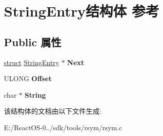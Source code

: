 \hypertarget{struct_string_entry}{}\section{String\+Entry结构体 参考}
\label{struct_string_entry}
\subsection*{Public 属性}
\begin{DoxyCompactItemize}
\item 
\mbox{\label{struct_string_entry_a480fd91372cd6d230a9219f2ee372bce}} 
\hyperlink{interfacestruct}{struct} \hyperlink{struct_string_entry}{String\+Entry} $\ast$ {\bfseries Next}
\item 
\mbox{\label{struct_string_entry_a8e8b199518de048ec520725b50030621}} 
U\+L\+O\+NG {\bfseries Offset}
\item 
\mbox{\label{struct_string_entry_a8c64620620391207daf45a0ea712f5a4}} 
char $\ast$ {\bfseries String}
\end{DoxyCompactItemize}


该结构体的文档由以下文件生成\+:\begin{DoxyCompactItemize}
\item 
E\+:/\+React\+O\+S-\/0../sdk/tools/rsym/rsym.\+c\end{DoxyCompactItemize}
